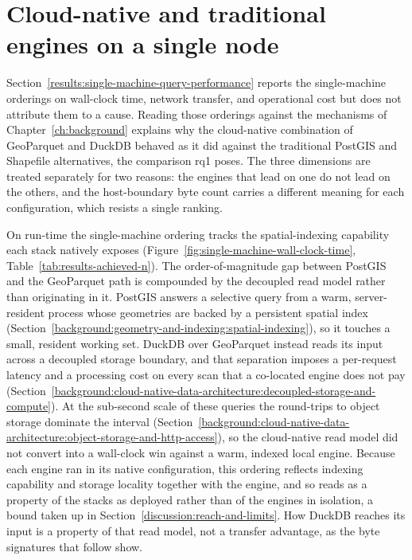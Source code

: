 \section{Cloud-native and traditional engines on a single node}
\label{discussion:single-node-cloud-native-vs-traditional}

Section~\ref{results:single-machine-query-performance} reports the single-machine orderings on wall-clock time, network transfer, and operational cost but does not attribute them to a cause. Reading those orderings against the mechanisms of Chapter~\ref{ch:background} explains why the cloud-native combination of GeoParquet and DuckDB behaved as it did against the traditional PostGIS and Shapefile alternatives, the comparison \acrshort{rq}1 poses. The three dimensions are treated separately for two reasons: the engines that lead on one do not lead on the others, and the host-boundary byte count carries a different meaning for each configuration, which resists a single ranking.

On run-time the single-machine ordering tracks the spatial-indexing capability each stack natively exposes (Figure~\ref{fig:single-machine-wall-clock-time}, Table~\ref{tab:results-achieved-n}). The order-of-magnitude gap between PostGIS and the GeoParquet path is compounded by the decoupled read model rather than originating in it. PostGIS answers a selective query from a warm, server-resident process whose geometries are backed by a persistent spatial index (Section~\ref{background:geometry-and-indexing:spatial-indexing}), so it touches a small, resident working set. DuckDB over GeoParquet instead reads its input across a decoupled storage boundary, and that separation imposes a per-request latency and a processing cost on every scan that a co-located engine does not pay \parencite{dageville2016_snowflake_elastic_data_warehouse,pang2024_storage_disaggregated_databases} (Section~\ref{background:cloud-native-data-architecture:decoupled-storage-and-compute}). At the sub-second scale of these queries the round-trips to object storage dominate the interval \parencite{fielding2022_rfc9110_http_semantics} (Section~\ref{background:cloud-native-data-architecture:object-storage-and-http-access}), so the cloud-native read model did not convert into a wall-clock win against a warm, indexed local engine. Because each engine ran in its native configuration, this ordering reflects indexing capability and storage locality together with the engine, and so reads as a property of the stacks as deployed rather than of the engines in isolation, a bound taken up in Section~\ref{discussion:reach-and-limits}. How DuckDB reaches its input is a property of that read model, not a transfer advantage, as the byte signatures that follow show.

